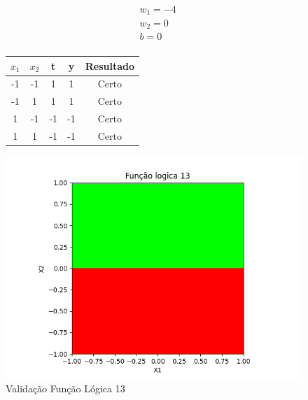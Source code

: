 \begin{figure}[h!]
\centering
\begin{minipage}[c]{0.49\linewidth}
\centering
\[
\begin{aligned}
&w_1 = -4\\
&w_2 = 0\\
&b = 0\\
\end{aligned}
\]
\begin{tabular}{|c|c|c|c|c|}\hline
$x_1$ & $x_2$ & t & y & Resultado\\ \hline
 -1 & -1 & 1 & 1 & Certo\\ \hline
 -1 & 1 & 1 & 1 & Certo\\ \hline
 1 & -1 & -1 & -1 & Certo\\ \hline
 1 & 1 & -1 & -1 & Certo\\ \hline
\end{tabular}
\end{minipage}
\hfill
\begin{minipage}[c]{0.5\linewidth}
\centering
\singlespacing
\includegraphics[width=1.2\textwidth]{im/im13}
\end{minipage}
\caption{Validação Função Lógica 13}
\label{vl13}
\end{figure}

